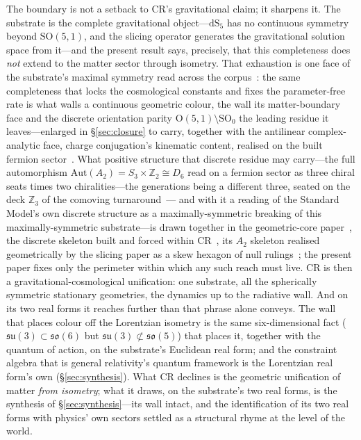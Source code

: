 \documentclass[11pt]{article}
\theoremstyle{plain}
\theoremstyle{remark}
\newcommand{\so}{\mathfrak{so}}
\newcommand{\su}{\mathfrak{su}}
\newcommand{\dS}{\mathrm{dS}}
\newcommand{\SO}{\mathrm{SO}}
\begin{document}
The boundary is not a setback to CR's gravitational claim; it sharpens it. The substrate is the complete gravitational object---$\dS_5$ has no continuous symmetry beyond $\SO(5,1)$, and the slicing operator generates the gravitational solution space from it---and the present result says, precisely, that this completeness does \emph{not} extend to the matter sector through isometry. That exhaustion is one face of the substrate's maximal symmetry read across the corpus~\cite{JanzenGeometricCore}: the same completeness that locks the cosmological constants and fixes the parameter-free rate is what walls a continuous geometric colour, the wall its matter-boundary face and the discrete orientation parity $\mathrm{O}(5,1)\setminus\mathrm{SO}_0$ the leading residue it leaves---enlarged in \S\ref{sec:closure} to carry, together with the antilinear complex-analytic face, charge conjugation's kinematic content, realised on the built fermion sector~\cite{JanzenMatter}. What positive structure that discrete residue may carry---the full automorphism $\mathrm{Aut}(A_2)=S_3\times\mathbb{Z}_2\cong D_6$ read on a fermion sector as three chiral seats times two chiralities---the generations being a different three, seated on the deck $\mathbb{Z}_3$ of the comoving turnaround~\cite{JanzenMatter}--- and with it a reading of the Standard Model's own discrete structure as a maximally-symmetric breaking of this maximally-symmetric substrate---is drawn together in the geometric-core paper~\cite{JanzenGeometricCore}, the discrete skeleton built and forced within CR~\cite{JanzenMatter}, its $A_2$ skeleton realised geometrically by the slicing paper as a skew hexagon of null rulings~\cite{JanzenSlicing}; the present paper fixes only the perimeter within which any such reach must live. CR is then a gravitational-cosmological unification: one substrate, all the spherically symmetric stationary geometries, the dynamics up to the radiative wall. And on its two real forms it reaches further than that phrase alone conveys. The wall that places colour off the Lorentzian isometry is the same six-dimensional fact ($\su(3)\subset\so(6)$ but $\su(3)\not\subset\so(5)$) that places it, together with the quantum of action, on the substrate's Euclidean real form; and the constraint algebra that is general relativity's quantum framework is the Lorentzian real form's own (\S\ref{sec:synthesis}). What CR declines is the geometric unification of matter \emph{from isometry}; what it draws, on the substrate's two real forms, is the synthesis of \S\ref{sec:synthesis}---its wall intact, and the identification of its two real forms with physics' own sectors settled as a structural rhyme at the level of the world.
\end{document}
